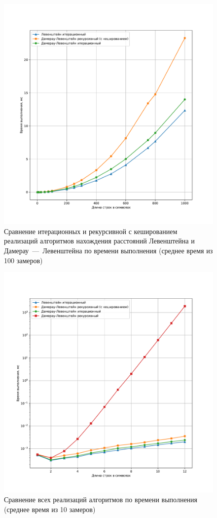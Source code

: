 \begin{figure}[H]
	\centering
	\includegraphics[width=\textwidth]{img/fn_three.pdf}
	\caption{Сравнение итерационных и рекурсивной с кешированием реализаций алгоритмов нахождения расстояний Левенштейна и Дамерау~---~Левенштейна по времени выполнения (среднее время из 100 замеров)}
	\label{fig:fn_three}
\end{figure}

\begin{figure}[H]
	\centering
	\includegraphics[width=\textwidth]{img/fn_four.pdf}
	\caption{Сравнение всех реализаций алгоритмов по времени выполнения (среднее время из 10 замеров)}
	\label{fig:fn_four}
\end{figure}

